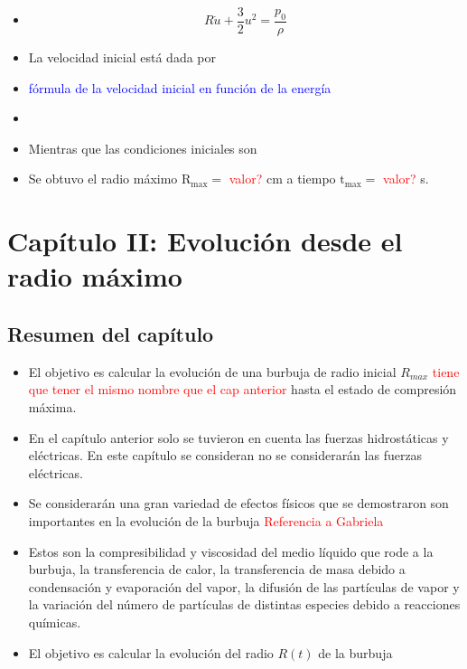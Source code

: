 \documentclass[aps,prb,onecolumn,superscriptaddress,floatfix,longbibliography,10pt]{revtex4-2}
\newif\ifptitle
\newif\ifpnumber
\newcounter{para}
\newcommand\ptitle[1]{\par\refstepcounter{para}
{\ifpnumber{\noindent\textcolor{lightgray}{\textbf{\thepara}}\indent}\fi}
{\ifptitle{\textbf{[{#1}]}}\fi}}
\begin{document}
\begin{itemize}
  \item 
  \begin{equation}
    R \dot{u} + \frac{3}{2}u^2 = \frac{p_0}{\rho}
  \end{equation}


  \item La velocidad inicial está dada por 
  \item \textcolor{blue}{fórmula de la velocidad inicial en función de la energía}
  \item 
  \item Mientras que las condiciones iniciales son 
  \item Se obtuvo el radio máximo $\mathrm{R_{max}} = $ \textcolor{red}{valor?} cm a tiempo $\mathrm{t_{max}} = $ \textcolor{red}{valor?} s.
\end{itemize}






























\section*{Capítulo II: Evolución desde el radio máximo}

\subsection{Resumen del capítulo}

\ptitle{Descripción general de los fenómenos}
\begin{itemize}
  \item El objetivo es calcular la evolución de una burbuja de radio inicial $R_{max}$ \textcolor{red}{tiene que tener el mismo nombre que el cap anterior} hasta el estado de compresión máxima.
  \item En el capítulo anterior solo se tuvieron en cuenta las fuerzas hidrostáticas y eléctricas. En este capítulo se consideran no se considerarán las fuerzas eléctricas.
  \item Se considerarán una gran variedad de efectos físicos que se demostraron son importantes en la evolución de la burbuja \textcolor{red}{Referencia a Gabriela}
  \item Estos son la compresibilidad y viscosidad del medio líquido que rode a la burbuja, la transferencia de calor, la transferencia de masa debido a condensación y evaporación del vapor, la difusión de las partículas de vapor y la variación del número de partículas de distintas especies debido a reacciones químicas.
  \item El objetivo es calcular la evolución del radio $R(t)$ de la burbuja
\end{itemize}
\end{document}
